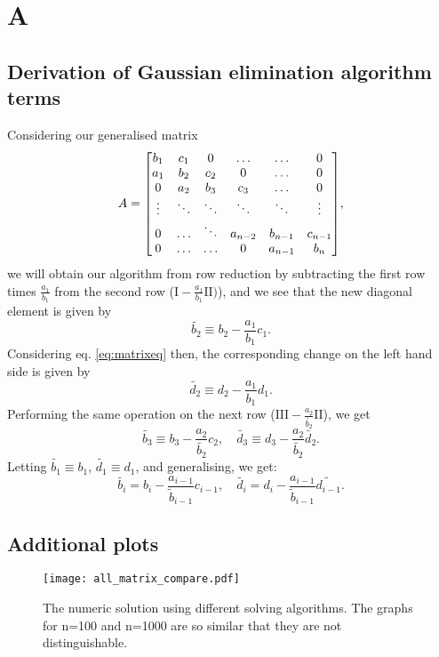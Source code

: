 \onecolumn
\section*{A}
\label{sec:appendix}
\renewcommand{\theequation}{\thesection .\arabic{equation}}

\subsection*{Derivation of Gaussian elimination algorithm terms}
\label{sec:derivgauss}
Considering our generalised matrix
  \[A =
    \mqty[b_1 & c_1 & 0 & \hdots & \hdots & 0 \\
          a_1 & b_2 & c_2 & 0 & \hdots & 0 \\
          0 & a_2 & b_3 & c_3 & \hdots & 0 \\
          \vdots & \ddots & \ddots & \ddots & \ddots & \vdots \\
          0 & \hdots & \ddots & a_{n-2} & b_{n-1} & c_{n-1} \\
          0 & \hdots & \hdots & 0 & a_{n-1} & b_n],
  \]
we will obtain our algorithm from row reduction by subtracting the first row
times $\frac{a_1}{b_1}$ from the second row ($\text{I} - \frac{a_1}{b_1}\text{II}
)$), and we see that the new diagonal element is given by
  \[\widetilde{b_2} \equiv b_2 - \frac{a_1}{b_1}c_1.\]
Considering eq. \ref{eq:matrixeq} then, the corresponding change on the left
hand side is given by
  \[\widetilde{d_2} \equiv d_2 - \frac{a_1}{b_1}d_1.\]
Performing the same operation on the next row
($\text{III} - \frac{a_2}{\widetilde{b_2}}\text{II}$), we get
  \[\widetilde{b_3} \equiv b_3 - \frac{a_2}{\widetilde{b_2}}c_2, \quad
  \widetilde{d_3} \equiv d_3 - \frac{a_2}{\widetilde{b_2}}\widetilde{d_2}.
  \]
Letting $\widetilde{b_1} \equiv b_1$, $\widetilde{d_1} \equiv d_1$, and
generalising, we get:
  \begin{equation}
    \widetilde{b_i} = b_i - \frac{a_{i-1}}{\widetilde{b}_{i-1}}c_{i-1}, \quad
    \widetilde{d_i} = d_i - \frac{a_{i-1}}{\widetilde{b}_{i-1}}\widetilde{d_{i-1}}.
  \end{equation}
  
\subsection*{Additional plots}

\begin{figure}[htbp]
	\centering
	\texttt{[image: all\_matrix\_compare.pdf]}
	\caption{The numeric solution using different solving algorithms. The graphs for n=100 and n=1000 are so similar that they are not distinguishable.}
	\label{fig:all}
\end{figure}